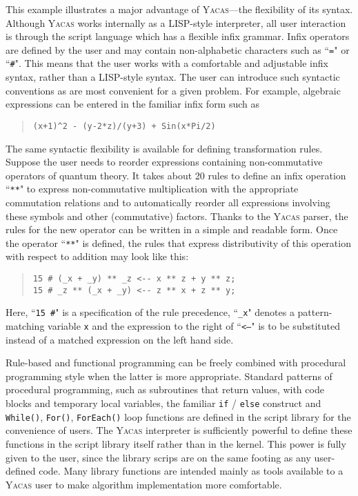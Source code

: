 \documentclass{llncs}
\begin{document}
This example illustrates a major advantage of \textsc{Yacas}---the flexibility of its syntax. Although \textsc{Yacas}
works internally as a LISP-style interpreter, all user interaction is through
the script language which has a flexible infix grammar. Infix operators
are defined by the user and may contain non-alphabetic characters such as ``\texttt{=}"
or ``\verb|#|". This means that the user works with a comfortable and adjustable infix syntax,
rather than a LISP-style syntax. The user can introduce such syntactic
conventions as are most convenient for a given problem.
For example, algebraic expressions can be entered
in the familiar infix form such as
%
\begin{quote}\small\begin{verbatim}
(x+1)^2 - (y-2*z)/(y+3) + Sin(x*Pi/2)
\end{verbatim}\end{quote}
%
The same syntactic flexibility is available for defining transformation rules.
Suppose the user needs to reorder expressions containing non-commutative
operators of quantum theory. It takes about 20
rules to define an infix operation ``\texttt{**}"
to express non-commutative multiplication with the appropriate commutation
relations and to automatically reorder all expressions involving these
symbols and other (commutative) factors. Thanks to the \textsc{Yacas} parser,
the rules for the new operator can be written in a simple and readable form. Once the operator
``\texttt{**}" is defined, the rules that express distributivity of this operation
with respect to addition may look like this:
\begin{quote}\small\begin{verbatim}
15 # (_x + _y) ** _z <-- x ** z + y ** z;
15 # _z ** (_x + _y) <-- z ** x + z ** y;
\end{verbatim}\end{quote}
Here, ``\verb|15 #|" is a specification of the rule precedence, ``\verb|_x|" denotes a
pattern-matching variable \texttt{x} and the expression to the right of ``\texttt{<--}" is to be
substituted instead of a matched expression on the left hand side.

Rule-based and functional programming can be freely combined with procedural
programming style when the latter is  more appropriate. Standard
patterns of procedural programming, such as subroutines that return values,
with code blocks and temporary local variables, the familiar \texttt{if} /
\texttt{else} construct and \texttt{While()}, \texttt{For()},
\texttt{ForEach()} loop functions are defined in the script library for the
convenience of users. The \textsc{Yacas} interpreter is sufficiently powerful
to define these functions in the script library itself rather than in the
kernel. This power is fully given to the user, since the library scrips are on
the same footing as any user-defined code. Many library functions are intended
mainly as tools available to a \textsc{Yacas} user to make algorithm
implementation more comfortable.
\end{document}

